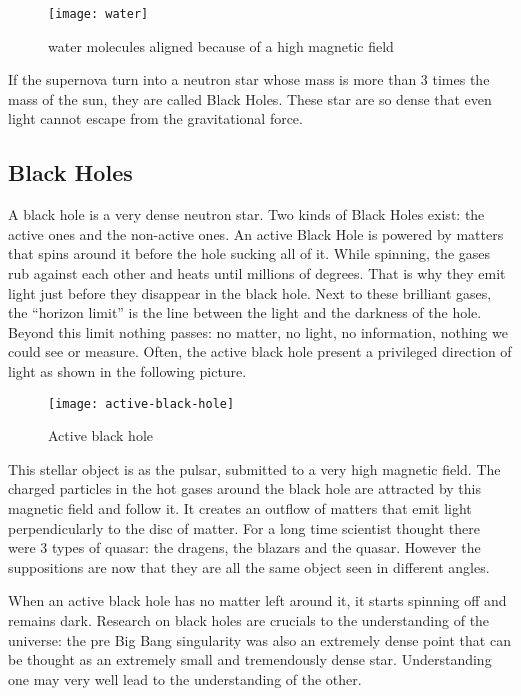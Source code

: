 \documentclass[a4paper, 11pt]{article} %
\begin{document}
\begin{figure}[h]
\centering
\texttt{[image: water]}
\caption{water molecules aligned because of a high magnetic field}
\label{water}
\end{figure}

If the supernova turn into a neutron star whose mass is more than 3 times the mass of the sun, they are called Black Holes. These star are so dense that even light cannot escape from the gravitational force. 



\subsection{Black Holes}
A black hole is a very dense neutron star. Two kinds of Black Holes exist: the active ones and the non-active ones. An active Black Hole is powered by matters that spins around it before the hole sucking all of it. While spinning, the gases rub against each other and heats until millions of degrees. That is why they emit light just before they disappear in the black hole. Next to these brilliant gases, the ``horizon limit'' is the line between the light and the darkness of the hole. Beyond this limit nothing passes: no matter, no light, no information, nothing we could see or measure. Often, the active black hole present a privileged direction of light as shown in the following picture.
\newpage
\begin{figure}[h]
\centering
\texttt{[image: active-black-hole]}
\caption{Active black hole}
\end{figure}


This stellar object is as the pulsar, submitted to a very high magnetic field. The charged particles in the hot gases around the black hole are attracted by this magnetic field and follow it. It creates an outflow of matters that emit light perpendicularly to the disc of matter. For a long time scientist thought there were 3 types of quasar: the dragens, the blazars and the quasar. However the suppositions are now that they are all the same object seen in different angles.

When an active black hole has no matter left around it, it starts spinning off and remains dark. Research on black holes are crucials to the understanding of the universe: the pre Big Bang singularity was also an extremely dense point that can be thought as an extremely small and tremendously dense star. Understanding one may very well lead to the understanding of the other. 
\end{document}
